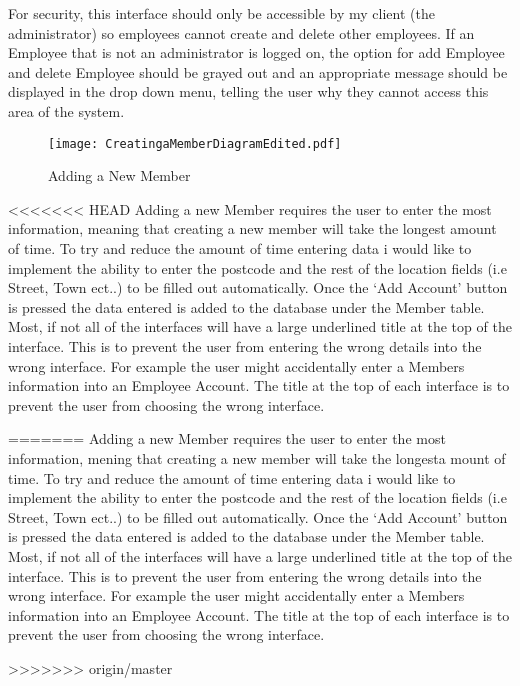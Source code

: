 For security, this interface should only be accessible by my client (the administrator) so employees cannot create and delete other employees. If an Employee that is not an administrator is logged on, the option for add Employee and delete Employee should be grayed out and an appropriate message should be displayed in the drop down menu, telling the user why they cannot access this area of the system. \par

\begin{figure}[H]
\caption{Adding a New Member} \label{fig:Adding a New Member Interface}
\hfill\texttt{[image: CreatingaMemberDiagramEdited.pdf]}\hspace*{\fill}
\end{figure}

<<<<<<< HEAD
Adding a new Member requires the user to enter the most information, meaning that creating a new member will take the longest amount of time. To try and reduce the amount of time entering data i would like to implement the ability to enter the postcode and the rest of the location fields (i.e Street, Town ect..) to be filled out automatically. Once the `Add Account' button is pressed the data entered is added to the database under the Member table. Most, if not all of the  interfaces will have a large underlined title at the top of the interface. This is to prevent the user from entering the wrong details into the wrong interface. For example the user might accidentally enter a Members information into an Employee Account. The title at the top of each interface is to prevent the user from choosing the wrong interface. \par
=======
Adding a new Member requires the user to enter the most information, mening that creating a new member will take the longesta mount of time. To try and reduce the amount of time entering data i would like to implement the ability to enter the postcode and the rest of the location fields (i.e Street, Town ect..) to be filled out automatically. Once the `Add Account' button is pressed the data entered is added to the database under the Member table. Most, if not all of the  interfaces will have a large underlined title at the top of the interface. This is to prevent the user from entering the wrong details into the wrong interface. For example the user might accidentally enter a Members information into an Employee Account. The title at the top of each interface is to prevent the user from choosing the wrong interface. \par
>>>>>>> origin/master

